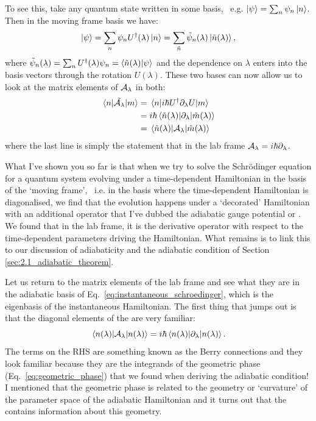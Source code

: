     To see this, take any quantum state written in some basis, \@~e.g. $\ket{\psi} = \sum_n \psi_n \ket{n}$. Then in the moving frame basis we have:
    \begin{equation}\label{eq:AGP_basis_change}
            \ket{\psi} = \sum_n \psi_n U^{\dagger}(\lambda) \ket{n} = \sum_{\Tilde{n}} \Tilde{\psi}_n (\lambda) \ket*{\Tilde{n}(\lambda)},
    \end{equation}
    where $\Tilde{\psi}_n (\lambda) = \sum_n U^{\dagger}(\lambda) \psi_n = \braket{\Tilde{n}(\lambda)}{\psi}$ and the dependence on $\lambda$ enters into the basis vectors through the rotation $U(\lambda)$. These two bases can now allow us to look at the matrix elements of $\mathcal{A}_{\lambda}$ in both:
    \begin{equation}\label{eq:AGP_as_derivative}
        \begin{aligned}
            \mel{n}{\Tilde{\mathcal{A}_{\lambda}}}{m} &= \mel{n}{i\hbar U^{\dagger}\partial_{\lambda}U}{m} \\
            &= i\hbar \mel{\Tilde{n}(\lambda)}{\partial_{\lambda}}{\Tilde{m}(\lambda)} \\
            &= \mel{\Tilde{n}(\lambda)}{\mathcal{A}_{\lambda}}{\Tilde{m}(\lambda)}
        \end{aligned}
    \end{equation}
    where the last line is simply the statement that in the lab frame $\mathcal{A}_{\lambda} = i\hbar \partial_{\lambda}$.

    What I've shown you so far is that when we try to solve the Schr\"{o}dinger equation for a quantum system evolving under a time-dependent Hamiltonian in the basis of the `moving frame', \@~i.e. in the basis where the time-dependent Hamiltonian is diagonalised, we find that the evolution happens under a `decorated' Hamiltonian with an additional operator that I've dubbed the adiabatic gauge potential or . We found that in the lab frame, it is the derivative operator with respect to the time-dependent parameters driving the Hamiltonian. What remains is to link this to our discussion of adiabaticity and the adiabatic condition of Section \ref{sec:2.1_adiabatic_theorem}.

    Let us return to the matrix elements of the lab frame  and see what they are in the adiabatic basis of Eq.~\eqref{eq:instantaneous_schroedinger}, which is the eigenbasis of the instantaneous Hamiltonian. The first thing that jumps out is that the diagonal elements of the  are very familiar:
    \begin{equation}\label{eq:AGP_diagonal}
        \mel{n(\lambda)}{\mathcal{A}_{\lambda}}{n(\lambda)} = i\hbar \mel{n(\lambda)}{\partial_{\lambda}}{n(\lambda)}.
    \end{equation}
    The terms on the RHS are something known as the Berry connections and they look familiar because they are the integrands of the geometric phase (Eq.~\eqref{eq:geometric_phase}) that we found when deriving the adiabatic condition! I mentioned that the geometric phase is related to the geometry or `curvature' of the parameter space of the adiabatic Hamiltonian and it turns out that the  contains information about this geometry. 

